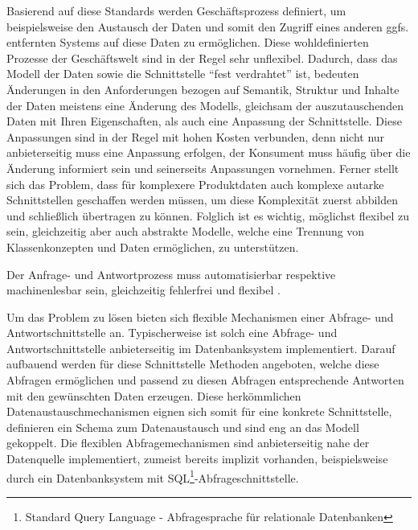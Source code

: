 Basierend auf diese Standards werden Geschäftsprozess definiert, um beispielsweise den Austausch der Daten und somit den Zugriff eines anderen ggfs. entfernten Systems auf diese Daten zu ermöglichen. Diese wohldefinierten Prozesse  der Geschäftswelt sind in der Regel sehr unflexibel. Dadurch, dass das Modell der Daten sowie die Schnittstelle \enquote{fest verdrahtet} ist, bedeuten Änderungen in den Anforderungen bezogen auf Semantik, Struktur und Inhalte der Daten meistens eine Änderung des Modells, gleichsam der auszutauschenden Daten mit Ihren Eigenschaften, als auch eine Anpassung der Schnittstelle. Diese Anpassungen sind in der Regel mit hohen Kosten verbunden, denn nicht nur anbieterseitig muss eine Anpassung erfolgen, der Konsument muss häufig über die Änderung informiert sein und seinerseits Anpassungen vornehmen. 
Ferner stellt sich das Problem, dass für komplexere Produktdaten auch komplexe autarke Schnittstellen geschaffen werden müssen, um diese Komplexität zuerst abbilden und schließlich übertragen zu können.  
Folglich ist es wichtig, möglichst flexibel zu sein, gleichzeitig aber auch abstrakte Modelle, welche eine Trennung von Klassenkonzepten und Daten ermöglichen, zu unterstützen. 

Der Anfrage- und Antwortprozess muss automatisierbar respektive machinenlesbar sein, gleichzeitig fehlerfrei und flexibel \citep[vgl.][]{uiterwykEclass}.


Um das Problem zu lösen bieten sich flexible Mechanismen einer Abfrage- und Antwortschnittstelle an. Typischerweise ist solch eine Abfrage- und Antwortschnittstelle anbieterseitig im Datenbanksystem implementiert. Darauf aufbauend werden für diese Schnittstelle Methoden angeboten, welche diese Abfragen ermöglichen und passend zu diesen Abfragen entsprechende Antworten mit den gewünschten Daten erzeugen. 
Diese herkömmlichen Datenaustauschmechanismen eignen sich somit für eine konkrete Schnittstelle, definieren ein Schema zum Datenaustausch und sind eng an das Modell gekoppelt. Die flexiblen Abfragemechanismen sind anbieterseitig nahe der Datenquelle implementiert, zumeist bereits implizit vorhanden, beispielsweise durch ein Datenbanksystem mit SQL\footnote{Standard Query Language - Abfragesprache für relationale Datenbanken}-Abfrageschnittstelle. 


